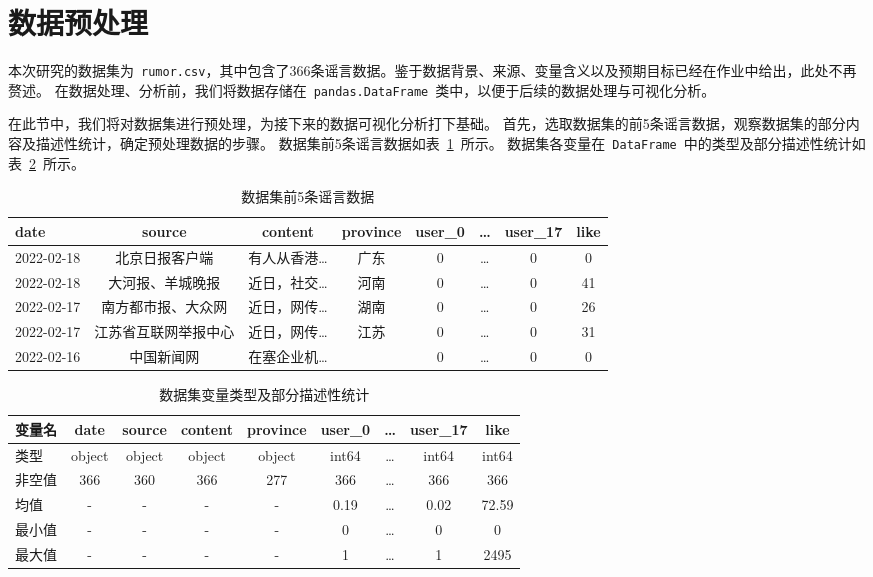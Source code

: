 \documentclass[UTF8]{ctexart}
\begin{document}
\clearpage
\makecover

\pagebreak

\tableofcontents

\pagebreak

\section{数据预处理}

本次研究的数据集为~\verb|rumor.csv|，其中包含了366条谣言数据。鉴于数据背景、来源、变量含义以及预期目标已经在作业中给出，此处不再赘述。
在数据处理、分析前，我们将数据存储在~\verb|pandas.DataFrame|~类中，以便于后续的数据处理与可视化分析。

在此节中，我们将对数据集进行预处理，为接下来的数据可视化分析打下基础。
首先，选取数据集的前5条谣言数据，观察数据集的部分内容及描述性统计，确定预处理数据的步骤。
数据集前5条谣言数据如表~\ref{tab:数据集内容}~所示。
数据集各变量在~\verb|DataFrame|~中的类型及部分描述性统计如表~\ref{tab:数据集变量类型、部分描述性}~所示。

\begin{table}[!ht] \centering
    \begin{tabularx}{\linewidth}{X c c c c c c c}
        \toprule
        date & source & content & province & user\_0 & \dots & user\_17 & like \\
        \midrule
        2022-02-18 & 北京日报客户端 & 有人从香港\dots & 广东 & 0 & \dots & 0 & 0 \\
        2022-02-18 & 大河报、羊城晚报 & 近日，社交\dots & 河南 & 0 & \dots & 0 & 41 \\
        2022-02-17 & 南方都市报、大众网 & 近日，网传\dots & 湖南 & 0 & \dots & 0 & 26 \\
        2022-02-17 & 江苏省互联网举报中心 & 近日，网传\dots & 江苏 & 0 & \dots & 0 & 31 \\
        2022-02-16 & 中国新闻网 & 在塞企业机\dots & \color{red}{NaN} & 0 & \dots & 0 & 0 \\
        \bottomrule
    \end{tabularx}
    \caption{数据集前5条谣言数据}
    \label{tab:数据集内容}
\end{table}

\begin{table}[!ht] \centering
    \begin{tabularx}{\linewidth}{X c c c c c c c c}
        \toprule
        变量名 & date & source & content & province & user\_0 & \dots & user\_17 & like \\
        \midrule
        类型 & object & object & object & object & int64 & \dots & int64 & int64 \\
        非空值 & 366 & 360 & 366 & 277 & 366 & \dots & 366 & 366 \\
        均值 & - & - & - & - & 0.19 & \dots & 0.02 & 72.59 \\
        最小值 & - & - & - & - & 0 & \dots & 0 & 0 \\
        最大值 & - & - & - & - & 1 & \dots & 1 & 2495 \\
        \bottomrule
    \end{tabularx}
    \caption{数据集变量类型及部分描述性统计}
    \label{tab:数据集变量类型、部分描述性}
\end{table}
\end{document}
